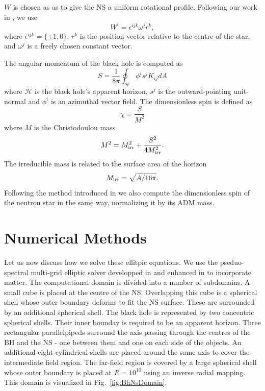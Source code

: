 $W$ is chosen as as to give the NS a uniform rotational
profile. Following our work in \cite{Tacik:2015tja}, we use
\begin{equation}
W^i=\epsilon^{ijk}\omega^jr^k,
\end{equation}
where $\epsilon^{ijk}=\{\pm1,0\}$, $r^k$ is the position vector relative to the centre of the star, and $\omega^j$ is a freely chosen constant vector.

The angular momentum of the black hole is computed as 
\begin{equation}
\label{eq:BhSpin}
S=\frac{1}{8\pi}\oint_{\mathcal{H}}\phi^is^jK_{ij}dA
\end{equation}
where $\mathcal{H}$ is the black hole's apparent horizon, $s^j$ is the
outward-pointing unit-normal and $\phi^i$ is an azimuthal vector
field. The dimensionless spin is defined as
\begin{equation}
\chi=\frac{S}{M^2}
\end{equation}
where $M$ is the Christodoulou mass
\begin{equation}
M^2=M_{\rm irr}^2+\frac{S^2}{4M_{\rm irr}^2}.
\end{equation}
The irreducible mass is related to the surface area of the horizon
\begin{equation}
M_{\rm irr}=\sqrt{A/16\pi}.
\end{equation}
Following the method introduced in \cite{Tacik:2015tja} we also compute the dimensionless spin
of the neutron star in the same way, normalizing it by its ADM mass.

\section{Numerical Methods}
Let us now discuss how we solve these ellitpic equations. We use the
pseduo-spectral multi-grid elliptic solver developped in
\cite{Pfeiffer2003} and enhanced in \cite{FoucartEtAl:2008} to incorporate matter. The computational domain is divided into a number of subdomains. A small cube is placed at the centre of the NS. Overlapping this cube is a spherical shell whose outer boundary deforms to fit the NS surface. These are surrounded by an additional spherical shell. The black hole is represented by two concentric spherical shells. Their inner bounday is required to be an apparent horizon. Three rectangular parallelpipeds surround the axis passing through the centres of the BH and the NS - one between them and one on each side of the objects. An additional eight cylindrical shells are placed around the same axis to cover the intermediate field region. The far-field region is covered by a large spherical shell whose outer boundary is placed at $R=10^{10}$ using an inverse radial mapping. This domain is visualized in Fig.~\ref{fig:BhNsDomain}.

